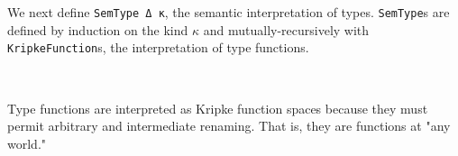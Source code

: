 \documentclass[authoryear, acmsmall, screen, review, nonacm]{acmart}
\begin{document}
We next define \verb!SemType Δ κ!, the semantic interpretation of types. \verb!SemType!s are defined by induction on the kind $\kappa$ and mutually-recursively with \verb!KripkeFunction!s, the interpretation of type functions.

\begin{code}[hide]%
\>[0]\AgdaSpace{}%
\AgdaSpace{}%
\AgdaSpace{}%
\AgdaSpace{}%
\AgdaSymbol{(}\AgdaSpace{}%
\AgdaSymbol{;}\AgdaSpace{}%
\AgdaSpace{}%
\AgdaSymbol{;}\AgdaSpace{}%
\AgdaSymbol{)}\AgdaSpace{}%
\<%
\end{code}
\begin{code}%
\>[0]\AgdaSpace{}%
\AgdaSymbol{:}\AgdaSpace{}%
\AgdaSpace{}%
\AgdaSpace{}%
\AgdaSpace{}%
\AgdaSpace{}%
\<%
\\
\>[0]\AgdaSpace{}%
\AgdaSymbol{:}\AgdaSpace{}%
\AgdaSpace{}%
\AgdaSpace{}%
\AgdaSpace{}%
\AgdaSpace{}%
\AgdaSpace{}%
\AgdaSpace{}%
\<%
\end{code}

Type functions are interpreted as Kripke function spaces because they must permit arbitrary and intermediate renaming. That is, they are functions at "any world."
\begin{code}%
\>[0]\AgdaSpace{}%
\AgdaSpace{}%
\AgdaSpace{}%
\AgdaSpace{}%
\AgdaSymbol{=}%
\>[27]\AgdaSpace{}%
\AgdaSymbol{\{}\AgdaSymbol{\}}\AgdaSpace{}%
\AgdaSpace{}%
\AgdaSpace{}%
\AgdaSpace{}%
\AgdaSpace{}%
\AgdaSpace{}%
\AgdaSpace{}%
\AgdaSpace{}%
\AgdaSpace{}%
\AgdaSpace{}%
\AgdaSpace{}%
\AgdaSpace{}%
\AgdaSymbol{)}\<%
\\
\>[0]\AgdaSpace{}%
\AgdaSpace{}%
\AgdaSymbol{(}\AgdaSpace{}%
\AgdaSpace{}%
\AgdaSymbol{)}\AgdaSpace{}%
\AgdaSymbol{=}\AgdaSpace{}%
\AgdaSpace{}%
\AgdaSpace{}%
\AgdaSpace{}%
\<%
\end{code}
\end{document}

